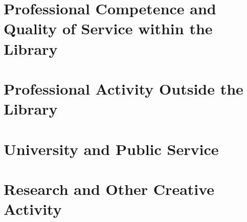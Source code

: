 \documentclass[12pt, oneside]{article}
\title{}
\author{Tim Dennis \\ Data Summary}
\date{April 2017 -- December 2019}
\begin{document}
\maketitle

\thispagestyle{fancy}



\section{Professional Competence and Quality of Service within the Library}




\section{Professional Activity Outside the Library}



\section{University and Public Service}



\section{Research and Other Creative Activity}


\end{document}
